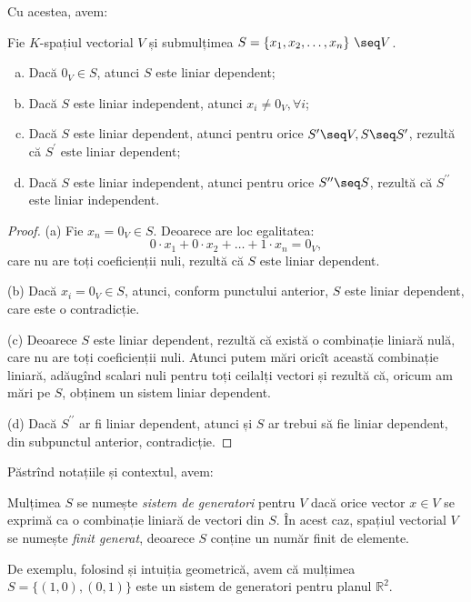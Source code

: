 Cu acestea, avem:
\begin{proposition}
Fie $K$-spațiul vectorial $V$ și submulțimea 
$S = \{x_1, x_2, \dots, x_n \} \seq V$.
\begin{enumerate}[(a)]
\item Dacă $0_V \in S$, atunci $S$ este liniar dependent;
\item Dacă $S$ este liniar independent, atunci $x_i \neq 0_V, \forall i$;
\item Dacă $S$ este liniar dependent, atunci pentru orice 
$S^{\prime} \seq V, S \seq S^{\prime}$, rezultă că $S^{\prime}$ este 
liniar dependent;
\item Dacă $S$ este liniar independent, atunci pentru orice 
$S^{\prime\prime} \seq S$, rezultă că $S^{\prime\prime}$ este liniar 
independent.
\end{enumerate}
\end{proposition}

\begin{proof}
(a) Fie $x_n = 0_V \in S$. Deoarece are loc egalitatea: 
\[
0 \cdot x_1 + 0 \cdot x_2 + \dots + 1 \cdot x_n = 0_V,
\]
care nu are toți coeficienții nuli, rezultă că $S$ este liniar dependent.

(b) Dacă $x_i = 0_V \in S$, atunci, conform punctului anterior, $S$ este 
liniar dependent, care este o contradicție.

(c) Deoarece $S$ este liniar dependent, rezultă că există o combinație liniară 
nulă, care nu are toți coeficienții nuli. Atunci putem mări oricît această 
combinație liniară, adăugînd scalari nuli pentru toți ceilalți vectori și 
rezultă că, oricum am mări pe $S$, obținem un sistem liniar dependent.

(d) Dacă $S^{\prime\prime}$ ar fi liniar dependent, atunci și $S$ ar trebui să 
fie liniar dependent, din subpunctul anterior, contradicție.
\end{proof}


Păstrînd notațiile și contextul, avem:
\begin{definition}
Mulțimea $S$ se numește \emph{sistem de generatori} pentru $V$ dacă orice 
vector $x \in V$ se exprimă ca o combinație liniară de vectori din $S$. În acest
caz, spațiul vectorial $V$ se numește \emph{finit generat}, deoarece $S$ 
conține un număr finit de elemente.
\end{definition}

De exemplu, folosind și intuiția geometrică, avem că mulțimea 
$S = \{(1, 0), (0, 1)\}$ este un sistem de generatori pentru planul 
$\mathbb{R}^2$.

